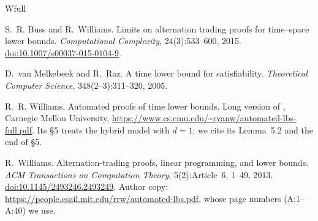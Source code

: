 \documentclass[11pt]{article}
\theoremstyle{definition}
\begin{document}
\begin{thebibliography}{Wfull}

S.~R. Buss and R.~Williams.
\newblock Limits on alternation trading proofs for time--space lower bounds.
\newblock \emph{Computational Complexity}, 24(3):533--600, 2015.
\newblock \href{https://doi.org/10.1007/s00037-015-0104-9}{doi:10.1007/s00037-015-0104-9}.

D.~van Melkebeek and R.~Raz.
\newblock A time lower bound for satisfiability.
\newblock \emph{Theoretical Computer Science}, 348(2--3):311--320, 2005.

R.~R. Williams.
\newblock Automated proofs of time lower bounds.
\newblock Long version of \cite{W13}, Carnegie Mellon University, \url{https://www.cs.cmu.edu/~ryanw/automated-lbs-full.pdf}. Its \S5 treats the hybrid model with $d=1$; we cite its Lemma~5.2 and the end of \S5.

R.~Williams.
\newblock Alternation-trading proofs, linear programming, and lower bounds.
\newblock \emph{ACM Transactions on Computation Theory}, 5(2):Article~6, 1--49, 2013.
\newblock \href{https://doi.org/10.1145/2493246.2493249}{doi:10.1145/2493246.2493249}.
\newblock Author copy: \url{https://people.csail.mit.edu/rrw/automated-lbs.pdf}, whose page numbers (A:1--A:40) we use.

\end{thebibliography}
\end{document}
